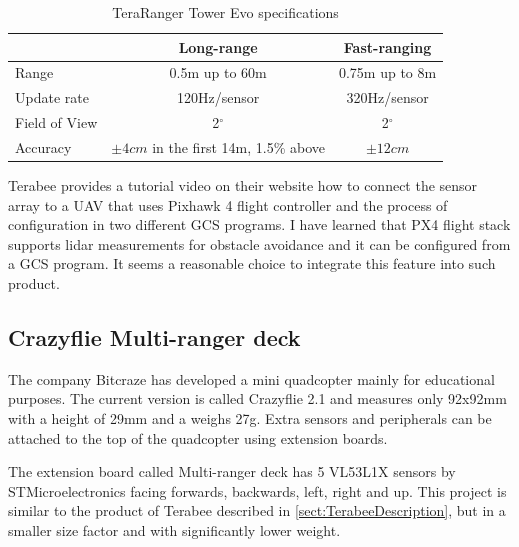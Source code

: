 \begin{table}[ht]
	\footnotesize
	\centering
	\begin{tabular}{ l c c }
		\toprule
		                & Long-range                                & Fast-ranging \\
		\midrule
		Range           & 0.5m up to 60m                            & 0.75m up to 8m \\
		Update rate     & 120Hz/sensor                              & 320Hz/sensor\\
		Field of View   & 2$^{\circ}$                               & 2$^{\circ}$\\
		Accuracy        & $\pm 4cm$ in the first 14m, 1.5\% above   & $\pm 12cm$\\
		\bottomrule
	\end{tabular}
	\caption{TeraRanger Tower Evo specifications}
	\label{tab:tera_ranger_features}
\end{table}

Terabee provides a tutorial video on their website\cite{TerabeeTeraRanger} how to connect the 
sensor array to a UAV that uses Pixhawk 4 flight controller and the process of configuration 
in two different GCS programs. I have learned that PX4 flight stack supports lidar measurements
for obstacle avoidance and it can be configured from a GCS program. It seems a reasonable choice 
to integrate this feature into such product.

\subsection{Crazyflie Multi-ranger deck}
The company Bitcraze has developed a mini quadcopter mainly for educational purposes. The current version is
called Crazyflie 2.1 and measures only 92x92mm with a height of 29mm and a weighs 27g.
Extra sensors and peripherals can be attached to the top of the quadcopter using extension boards.

The extension board called Multi-ranger deck has 5 VL53L1X sensors by STMicroelectronics facing forwards, 
backwards, left, right and up. This project is similar to the product of Terabee described in \ref{sect:TerabeeDescription}, 
but in a smaller size factor and with significantly lower weight.

